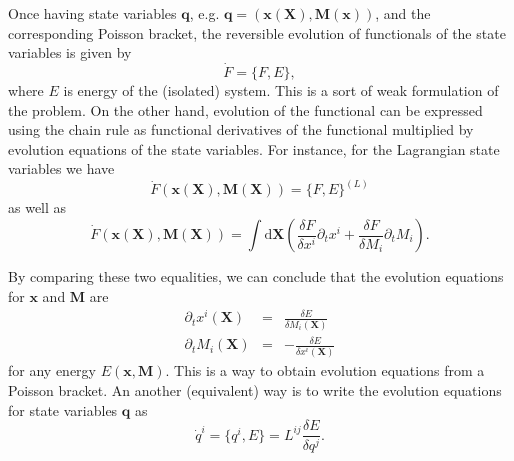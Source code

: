 \documentclass[
10pt, %
a4paper, %
oneside, %
headinclude,footinclude, %
BCOR5mm, %
]{scrartcl}
\newcommand{\xx}{\mathbf{x}}
\newcommand{\XX}{\mathbf{X}}
\newcommand{\dX}{\mathrm{d}\XX}
\newcommand{\MM}{\mathbf{M}}
\newcommand{\qq}{\mathbf{q}}
\newcommand{\MP}[1]{{\color{Green}MP:\ \ #1}}
\newcommand{\IP}[1]{{\color{Red}IP:\ \ #1}}
\newcommand{\pd}{\partial}
\begin{document}
Once having state variables $\qq$, e.g. $\qq=(\xx(\XX),\MM(\xx))$, and the corresponding Poisson bracket, the reversible evolution of functionals of the state variables is given by 
\begin{equation}
	\dot{F} = \{F,E\},
\end{equation}
where $E$ is energy of the (isolated) system. This is a sort of weak formulation of the problem. On the other hand, evolution of the functional can be expressed using the chain rule as functional derivatives of the functional multiplied by evolution equations of the state variables. For instance, for the Lagrangian state variables we have 
\begin{equation}
	\dot{F}(\xx(\XX),\MM(\XX)) = \{F,E\}^{(L)}
\end{equation}
as well as
\begin{equation}
	\dot{F}(\xx(\XX),\MM(\XX)) = \int\dX \left(\frac{\delta F}{\delta x^i} \partial_t x^i + \frac{\delta F}{\delta M_i} \partial_t M_i \right).
\end{equation}

By comparing these two equalities, we can conclude that the evolution equations for $\xx$ and $\MM$ are
\begin{subequations}\label{eq.L.evo}
	\begin{eqnarray}
		\partial_t x^i(\XX) &=& \frac{\delta E}{\delta M_i(\XX)}\\
		\partial_t M_i(\XX) &=& -\frac{\delta E}{\delta x^i(\XX)}\label{eq.L.evo.mom}
	\end{eqnarray}
\end{subequations}
	for any energy $E(\xx,\MM)$. 
This is a way to obtain evolution equations from a Poisson bracket. An another (equivalent) way is 
to write the evolution equations for state variables $\qq$ as
\begin{equation}\label{eq.qL}
	\dot{q}^i = \{q^i, E\} = L^{ij} \frac{\delta E}{\delta q^j}.
\end{equation}
\end{document}
